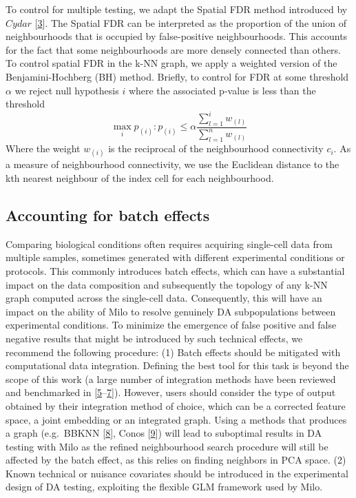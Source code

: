 \documentclass[
]{article}
\begin{document}
To control for multiple testing, we adapt the Spatial FDR method introduced by \(Cydar\) {[}\protect\hyperlink{ref-lunTestingDifferentialAbundance2017}{3}{]}. The Spatial FDR can be interpreted as the proportion of the union of neighbourhoods that is occupied by false-positive neighbourhoods. This accounts for the fact that some neighbourhoods are more densely connected than others. To control spatial FDR in the k-NN graph, we apply a weighted version of the Benjamini-Hochberg (BH) method. Briefly, to control for FDR at some threshold \(\alpha\) we reject null hypothesis \(i\) where the associated p-value is less than the threshold
\[
\max_i{p_{(i)}: p_{(i)}\le \alpha\frac{\sum_{l=1}^{i}w_{(l)}}{\sum_{l=1}^{n}w_{(l)}}}
\]
Where the weight \(w_{(i)}\) is the reciprocal of the neighbourhood connectivity \(c_i\). As a measure of neighbourhood connectivity, we use the Euclidean distance to the kth nearest neighbour of the index cell for each neighbourhood.

\hypertarget{accounting-for-batch-effects}{%
\subsection{Accounting for batch effects}\label{accounting-for-batch-effects}}

Comparing biological conditions often requires acquiring single-cell data from multiple samples, sometimes generated with different experimental conditions or protocols. This commonly introduces batch effects, which can have a substantial impact on the data composition and subsequently the topology of any k-NN graph computed across the single-cell data. Consequently, this will have an impact on the ability of Milo to resolve genuinely DA subpopulations between experimental conditions. To minimize the emergence of false positive and false negative results that might be introduced by such technical effects, we recommend the following procedure: (1) Batch effects should be mitigated with computational data integration. Defining the best tool for this task is beyond the scope of this work (a large number of integration methods have been reviewed and benchmarked in {[}\protect\hyperlink{ref-lueckenBenchmarkingAtlaslevelData2020}{5}--\protect\hyperlink{ref-tranBenchmarkBatcheffectCorrection2020}{7}{]}). However, users should consider the type of output obtained by their integration method of choice, which can be a corrected feature space, a joint embedding or an integrated graph. Using a methods that produces a graph (e.g.~BBKNN {[}\protect\hyperlink{ref-polanskiBBKNNFastBatch}{8}{]}, Conos {[}\protect\hyperlink{ref-barkasJointAnalysisHeterogeneous2019}{9}{]}) will lead to suboptimal results in DA testing with Milo as the refined neighbourhood search procedure will still be affected by the batch effect, as this relies on finding neighbors in PCA space. (2) Known technical or nuisance covariates should be introduced in the experimental design of DA testing, exploiting the flexible GLM framework used by Milo.
\end{document}
